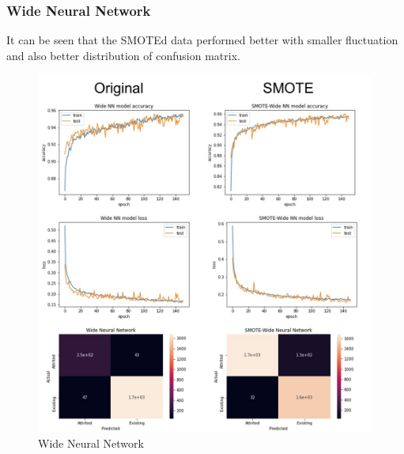 \documentclass{homeworg}
\begin{document}
\subsubsection{Wide Neural Network}
It can be seen that the SMOTEd data performed better with smaller fluctuation and also better distribution of confusion matrix.
\begin{figure}[H]
    \centering
    \includegraphics[scale=0.6]{figure/WIDE NN SUMMAR.png}
    \caption{Wide Neural Network}
    \label{fig:WBBSynnary}
\end{figure}
\end{document}
